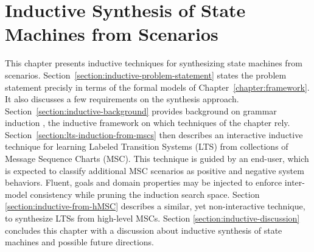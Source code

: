 \chapter{Inductive Synthesis of State Machines from Scenarios\label{chapter:inductive-synthesis}}

This chapter presents inductive techniques for synthesizing state machines from scenarios. Section~\ref{section:inductive-problem-statement} states the problem statement precisly in terms of the formal models of Chapter~\ref{chapter:framework}. It also discusses a few requirements on the synthesis approach. Section~\ref{section:inductive-background} provides background on grammar induction \cite{Gold:1978}, the inductive framework on which techniques of the chapter rely. Section~\ref{section:lts-induction-from-mscs} then describes an interactive inductive technique for learning Labeled Transition Systems (LTS) from collections of Message Sequence Charts (MSC). This technique is guided by an end-user, which is expected to classify additional MSC scenarios as positive and negative system behaviors. Fluent, goals and domain properties may be injected to enforce inter-model consistency while pruning the induction search space. Section \ref{section:inductive-from-hMSC} describes a similar, yet non-interactive technique, to synthesize LTSs from high-level MSCs. Section \ref{section:inductive-discussion} concludes this chapter with a discussion about inductive synthesis of state machines and possible future directions. 







